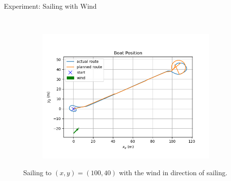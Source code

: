 \documentclass[10pt,xcolor={table,dvipsnames},t]{beamer}
\begin{document}
\begin{frame}{Experiment: Sailing with Wind}
\begin{figure}
\begin{subfigure}[b]{0.4\textwidth}
         \label{fig:with_wind_speed}
     \end{subfigure}
     \hfill\\
     \begin{subfigure}[b]{0.4\textwidth}
         \centering
         \includegraphics[width=\textwidth,trim={0.5cm 1cm 1.25cm 1.5cm },clip]{documents/final_pres_figs/with_wind_to_40_40_pos.png}
         \label{fig:with_wind_pos}
     \end{subfigure}
    \caption{Sailing to \((x,y)=(100,40)\) with the wind in direction of sailing.}
    \label{fig:rstarst}
\end{figure}
\end{frame}
\end{document}
